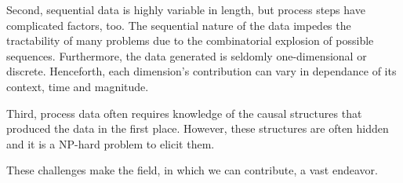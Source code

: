 \documentclass[./../../paper.tex]{subfiles}
\begin{document}
Second, sequential data is highly variable in length, but process steps have complicated factors, too. The sequential nature of the data impedes the tractability of many problems due to the combinatorial explosion of possible sequences. 
Furthermore, the data generated is seldomly one-dimensional or discrete. Henceforth, each dimension's contribution can vary in dependance of its context, time and magnitude. 

Third, process data often requires knowledge of the causal structures that produced the data in the first place. However, these structures are often hidden and it is a NP-hard problem to elicit them\autocite{wang_Efficientrecoverymissing_2013}.

These challenges make the field, in which we can contribute, a vast endeavor. 
\end{document}
